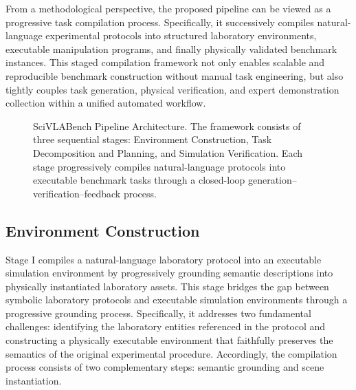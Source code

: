\documentclass[sigconf]{acmart}
\begin{document}
From a methodological perspective, the proposed pipeline can be viewed as a progressive task compilation process. Specifically, it successively compiles natural-language experimental protocols into structured laboratory environments, executable manipulation programs, and finally physically validated benchmark instances. This staged compilation framework not only enables scalable and reproducible benchmark construction without manual task engineering, but also tightly couples task generation, physical verification, and expert demonstration collection within a unified automated workflow.

\begin{figure}[t]
\centering
\caption{SciVLABench Pipeline Architecture. The framework consists of three sequential stages: Environment Construction, Task Decomposition and Planning, and Simulation Verification. Each stage progressively compiles natural-language protocols into executable benchmark tasks through a closed-loop generation–verification–feedback process.}
\label{fig:framework_overview}
\end{figure}

\subsection{Environment Construction}

Stage I compiles a natural-language laboratory protocol into an executable simulation environment by progressively grounding semantic descriptions into physically instantiated laboratory assets. This stage bridges the gap between symbolic laboratory protocols and executable simulation environments through a progressive grounding process. Specifically, it addresses two fundamental challenges: identifying the laboratory entities referenced in the protocol and constructing a physically executable environment that faithfully preserves the semantics of the original experimental procedure. Accordingly, the compilation process consists of two complementary steps: semantic grounding and scene instantiation.
\end{document}
